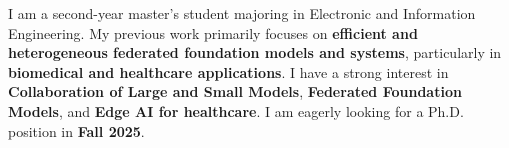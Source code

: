 

\begin{cvparagraph}


I am a second-year master's student majoring in Electronic and Information Engineering.
My previous work primarily focuses on \textbf{efficient and heterogeneous federated foundation models and systems}, particularly in \textbf{biomedical and healthcare applications}.
I have a strong interest in \textbf{Collaboration of Large and Small Models}, \textbf{Federated Foundation Models}, and \textbf{Edge AI for healthcare}.
I am eagerly looking for a Ph.D. position in \textbf{Fall 2025}.


\end{cvparagraph}
